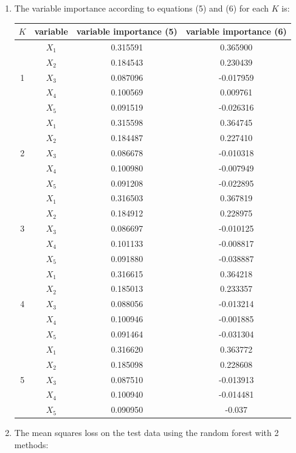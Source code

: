 \documentclass[paper=letter, fontsize=12pt]{article}
\begin{document}
\begin{enumerate}[label=(\alph*)]
\begin{enumerate}[label=(\roman*)]
		\item The variable importance according to equations (5) and (6) for each $K$ is:
		
		\begin{longtable}{|c|c|c|c|}
			\hline
			$K$ & variable & variable importance (5) & variable importance (6) \\ \hline
			\multirow{5}{1em}{1} & $X_1$ & 0.315591 & 0.365900 \\ 
			& $X_2$ & 0.184543 & 0.230439 \\
			& $X_3$ & 0.087096 & -0.017959 \\
			& $X_4$ & 0.100569 & 0.009761 \\
			& $X_5$ & 0.091519 & -0.026316 \\
			\hline
			\multirow{5}{1em}{2} & $X_1$ & 0.315598 & 0.364745 \\ 
			& $X_2$ & 0.184487 & 0.227410 \\
			& $X_3$ & 0.086678 & -0.010318 \\
			& $X_4$ & 0.100980 & -0.007949 \\
			& $X_5$ & 0.091208 & -0.022895 \\
			\hline
			\multirow{5}{1em}{3} & $X_1$ & 0.316503 & 0.367819 \\ 
			& $X_2$ & 0.184912 & 0.228975 \\
			& $X_3$ & 0.086697 & -0.010125 \\
			& $X_4$ & 0.101133 & -0.008817 \\
			& $X_5$ & 0.091880 & -0.038887 \\
			\hline
			\multirow{5}{1em}{4} & $X_1$ & 0.316615 & 0.364218 \\ 
			& $X_2$ & 0.185013 & 0.233357 \\
			& $X_3$ & 0.088056 & -0.013214 \\
			& $X_4$ & 0.100946 & -0.001885 \\
			& $X_5$ & 0.091464 & -0.031304 \\
			\hline
			\multirow{5}{1em}{5} & $X_1$ & 0.316620 & 0.363772 \\ 
			& $X_2$ & 0.185098 & 0.228608 \\
			& $X_3$ & 0.087510 & -0.013913 \\
			& $X_4$ & 0.100940 & -0.014481 \\
			& $X_5$ & 0.090950 & -0.037 \\
			\hline
		\end{longtable}
		
		
		\item The mean squares loss on the test data using the random forest with 2 methods:
		

\end{enumerate}
\end{enumerate}
\end{document}
